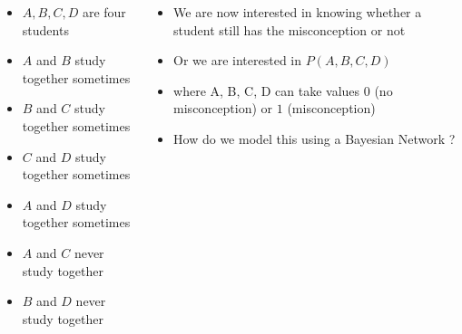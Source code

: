 \begin{frame}
	\begin{columns}
		\begin{overlayarea}{\textwidth}{\textheight}
		\vspace{0.1in}
		\begin{center}
		\end{center}
		\begin{itemize}\justifying
			\item<1-> $A,B,C,D$ are four students
			\item<1-> $A$ and $B$ study together sometimes
			\item<1-> $B$ and $C$ study together sometimes
			\item<1-> $C$ and $D$ study together sometimes
			\item<1-> $A$ and $D$ study together sometimes
			\item<1-> $A$ and $C$ never study together
			\item<1-> $B$ and $D$ never study together
		\end{itemize}
		\end{overlayarea}
		\begin{overlayarea}{\textwidth}{\textheight}
			\begin{itemize}\justifying
			\item<1-> We are now interested in knowing whether a student still has the misconception or not
			\item<2-> Or we are interested in $P(A, B, C, D)$
			\item<3-> where A, B, C, D can take values $0$ (no misconception) or $1$ (misconception)
			\item<4-> How do we model this using a Bayesian Network ?
			\end{itemize}
		\end{overlayarea}
	\end{columns}
\end{frame}



